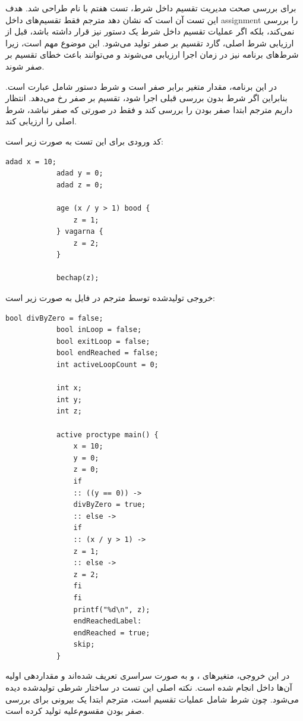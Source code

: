 \documentclass[12pt]{report}
\begin{document}
	برای بررسی صحت مدیریت تقسیم داخل شرط، تست هفتم با نام  طراحی شد. 
	هدف این تست آن است که نشان دهد مترجم فقط تقسیم‌های داخل assignment را بررسی نمی‌کند، بلکه اگر عملیات تقسیم داخل شرط یک دستور  نیز قرار داشته باشد، قبل از ارزیابی شرط اصلی، گارد تقسیم بر صفر تولید می‌شود. 
	این موضوع مهم است، زیرا شرط‌های برنامه نیز در زمان اجرا ارزیابی می‌شوند و می‌توانند باعث خطای تقسیم بر صفر شوند.
	
	
	در این برنامه، مقدار متغیر  برابر صفر است و شرط دستور  شامل عبارت  است. 
	بنابراین اگر شرط بدون بررسی قبلی اجرا شود، تقسیم بر صفر رخ می‌دهد. 
	انتظار داریم مترجم ابتدا صفر بودن  را بررسی کند و فقط در صورتی که  صفر نباشد، شرط اصلی را ارزیابی کند.
	
	کد ورودی  برای این تست به صورت زیر است:
	
	\begin{latin}
		\begin{lstlisting}[style=hashstyle]
			adad x = 10;
			adad y = 0;
			adad z = 0;
			
			age (x / y > 1) bood {
				z = 1;
			} vagarna {
				z = 2;
			}
			
			bechap(z);
		\end{lstlisting}
	\end{latin}
	
	خروجی تولیدشده توسط مترجم در فایل  به صورت زیر است:
	
	\begin{latin}
		\begin{lstlisting}[style=codestyle]
			bool divByZero = false;
			bool inLoop = false;
			bool exitLoop = false;
			bool endReached = false;
			int activeLoopCount = 0;
			
			int x;
			int y;
			int z;
			
			active proctype main() {
				x = 10;
				y = 0;
				z = 0;
				if
				:: ((y == 0)) ->
				divByZero = true;
				:: else ->
				if
				:: (x / y > 1) ->
				z = 1;
				:: else ->
				z = 2;
				fi
				fi
				printf("%d\n", z);
				endReachedLabel:
				endReached = true;
				skip;
			}
		\end{lstlisting}
	\end{latin}
	
	در این خروجی، متغیرهای ،  و  به صورت سراسری تعریف شده‌اند و مقداردهی اولیه آن‌ها داخل  انجام شده است. 
	نکته اصلی این تست در ساختار شرطی تولیدشده دیده می‌شود. 
	چون شرط  شامل عملیات تقسیم است، مترجم ابتدا یک  بیرونی برای بررسی صفر بودن مقسوم‌علیه تولید کرده است.
	
\end{document}
